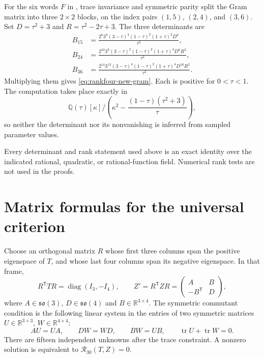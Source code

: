\documentclass[11pt,a4paper]{article}
\begin{document}
For the six words $F$ in , trace invariance and symmetric parity split the Gram matrix into three $2\times2$ blocks, on the index pairs $(1,5)$, $(2,4)$, and $(3,6)$.  Set $D=\tau^2+3$ and $R=\tau^2-2\tau+3$.  The three determinants are
\begin{align*}
 B_{15}&=\frac{2^8 3^9(3-\tau)^4(1-\tau)^2(1+\tau)^2D^8}{\tau^2},\\
 B_{24}&=\frac{2^{10}3^9(3-\tau)^2(1-\tau)^2(1+\tau)^4D^6R^2}{\tau^2},\\
 B_{36}&=\frac{2^{14}3^{13}(3-\tau)^4(1-\tau)^2(1+\tau)^4D^{10}R^2}{\tau^2}.
\end{align*}
Multiplying them gives \eqref{eq:rankfour-new-gram}.  Each is positive for $0<\tau<1$.  The computation takes place exactly in
\[
 \mathbb Q(\tau)[\kappa]\big/
 \left(\kappa^2-\frac{(1-\tau)(\tau^2+3)}\tau\right),
\]
so neither the determinant nor its nonvanishing is inferred from sampled parameter values.

Every determinant and rank statement used above is an exact identity over the indicated rational, quadratic, or rational-function field.  Numerical rank tests are not used in the proofs.

\section{Matrix formulas for the universal criterion}
\label{app:universal-certificates}

Choose an orthogonal matrix $R$ whose first three columns span the positive eigenspace of $T$, and whose last four columns span its negative eigenspace.  In that frame,
\[
R^{\mathsf T}TR=\operatorname{diag}(I_3,-I_4),\qquad
Z'=R^{\mathsf T}ZR=\begin{pmatrix}A&B\\-B^{\mathsf T}&D\end{pmatrix},
\]
where $A\in\mathfrak{so}(3)$, $D\in\mathfrak{so}(4)$ and $B\in\mathbb R^{3\times4}$.  The symmetric commutant condition is the following linear system in the entries of two symmetric matrices $U\in\mathbb R^{3\times3}$, $W\in\mathbb R^{4\times4}$:
\begin{equation}
AU=UA,\qquad DW=WD,\qquad BW=UB,
\qquad \operatorname{tr}U+\operatorname{tr}W=0.
\label{eq:block-commutant}
\end{equation}
There are fifteen independent unknowns after the trace constraint.  A nonzero solution is equivalent to $\mathcal R_{30}(T,Z)=0$.
\end{document}
